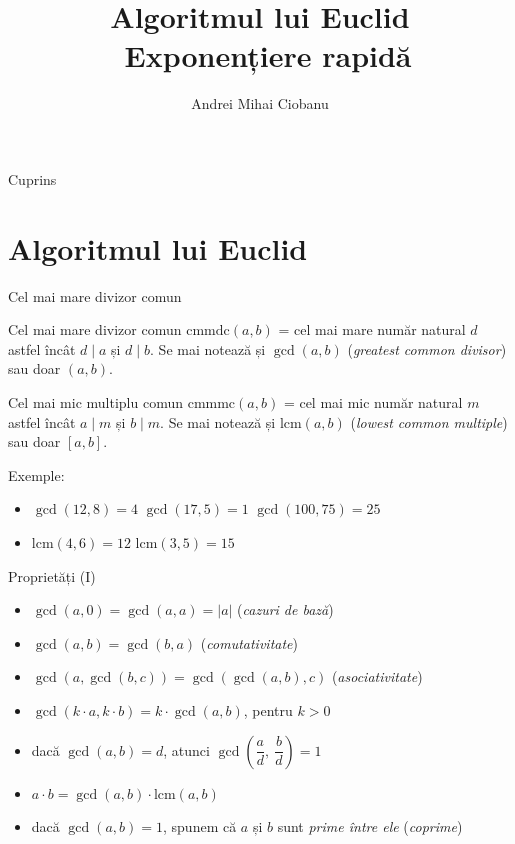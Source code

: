 \documentclass{beamer}
\title{Algoritmul lui Euclid \textbar\ Exponențiere rapidă}
\subtitle{}
\author{Andrei Mihai Ciobanu}
\institute{Algolymp Summer School}
\date{}
\begin{document}
\begin{frame}
  \titlepage
\end{frame}

\begin{frame}{Cuprins}
  \tableofcontents
\end{frame}

\section{Algoritmul lui Euclid}

\begin{frame}{Cel mai mare divizor comun}
  \begin{block}{Cel mai mare divizor comun}
    $\text{cmmdc}(a, b)$ = cel mai mare număr natural $d$ astfel încât $d \mid a$ și $d \mid b$. Se mai notează și $\gcd(a, b)$ (\textit{greatest common divisor}) sau doar $(a, b)$.
  \end{block}
  \bigskip
  \begin{block}{Cel mai mic multiplu comun}
    $\text{cmmmc}(a, b)$ = cel mai mic număr natural $m$ astfel încât $a \mid m$ și $b \mid m$. Se mai notează și $\text{lcm}(a, b)$ (\textit{lowest common multiple}) sau doar $[a, b]$.
  \end{block}
  \bigskip
  Exemple:
  \begin{itemize}
    \item $\gcd(12, 8) = 4$ \quad $\gcd(17, 5) = 1$ \quad $\gcd(100, 75) = 25$
    \item $\text{lcm}(4, 6) = 12$ \quad $\text{lcm}(3, 5) = 15$
  \end{itemize}
\end{frame}

\begin{frame}{Proprietăți (I)}
  \begin{itemize}
    \item $\gcd(a, 0) = \gcd(a, a) = |a|$ \quad \quad (\textit{cazuri de bază})
    \item $\gcd(a, b) = \gcd(b, a)$ \quad (\textit{comutativitate})
    \item $\gcd(a, \gcd(b, c)) = \gcd(\gcd(a, b), c)$ \quad (\textit{asociativitate})
    \item $\gcd(k \cdot a, k \cdot b) = k \cdot \gcd(a, b)$, pentru $k > 0$
    \item dacă $\gcd(a, b) = d$, atunci $\gcd\!\left(\dfrac{a}{d},\ \dfrac{b}{d}\right) = 1$
    \item $a \cdot b = \gcd(a, b) \cdot \text{lcm}(a, b)$
    \item dacă $\gcd(a, b) = 1$, spunem că $a$ și $b$ sunt \textit{prime între ele} (\textit{coprime})
  \end{itemize}
\end{frame}
\end{document}
